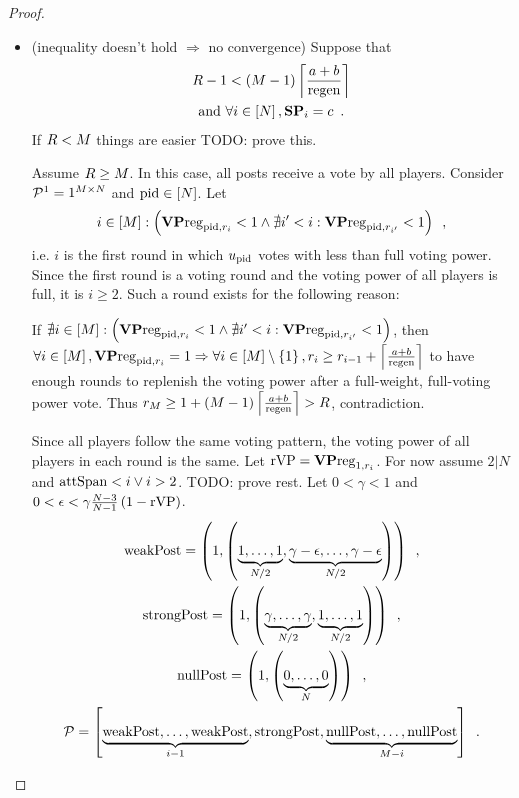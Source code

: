 \begin{proof}
\begin{itemize}
    \item (inequality doesn't hold $\Rightarrow$ no convergence) Suppose that
    \begin{gather}
      \label{conv:proof:fewrounds}
      \rounds - 1 < \left(\postlen - 1\right)\ceil*{\frac{a+b}{\regen}} \\
      \text{and } \forall i \in \left[\playerlen\right], \stpowvec_i = c
      \enspace. \nonumber
    \end{gather}
    If $\rounds < \postlen$ things are easier TODO: prove this.

    Assume $\rounds \geq \postlen$. In this case, all posts receive a vote by
    all players. Consider $\postlist^1 = 1^{\postlen \times \playerlen}$ and
    $\pid \in \left[\playerlen\right]$. Let
    \begin{equation*}
      i \in \left[\postlen\right] :\left(\votpowvecreg_{\pid, \round_i} < 1
      \wedge \nexists i' < i: \votpowvecreg_{\pid, \round_{i'}} < 1\right)
      \enspace,
    \end{equation*}
    i.e. $i$ is the first round in which $u_\pid$ votes with less than full
    voting power. Since the first round is a voting round and the voting power
    of all players is full, it is $i \geq 2$. Such a round exists for the
    following reason:

    If $\nexists i \in \left[\postlen\right] :\left(\votpowvecreg_{\pid,
    \round_i} < 1 \wedge \nexists i' < i: \votpowvecreg_{\pid, \round_{i'}} <
    1\right)$, then $\forall i \in \left[\postlen\right], \votpowvecreg_{\pid,
    \round_i} = 1 \Rightarrow \forall i \in \left[\postlen\right] \setminus
    \left\{1\right\}, \round_i \geq \round_{i - 1} + \ceil*{\frac{a +
    b}{\regen}}$ to have enough rounds to replenish the voting power after a
    full-weight, full-voting power vote. Thus $\round_\postlen \geq 1 +
    \left(\postlen - 1\right)\ceil*{\frac{a + b}{\regen}} > \rounds$,
    contradiction.

    Since all players follow the same voting pattern, the voting power of all
    players in each round is the same. Let $\rvp =
    \votpowvecreg_{1, \round_i}$. For now assume $2 | N$ and $\attspan < i \vee
    i > 2$. TODO: prove rest. Let $0 < \gamma < 1$ and $0 < \epsilon <
    \gamma\frac{\playerlen - 3}{\playerlen - 1}\left(1 -
    \rvp\right)$.
    \begin{gather*}
      \weakpost = \left(1, \left(\underbrace{1, \dots, 1}_{\playerlen/2},
      \underbrace{\gamma - \epsilon, \dots, \gamma -
      \epsilon}_{\playerlen/2}\right)\right) \enspace, \\
      \strongpost = \left(1, \left(\underbrace{\gamma, \dots,
      \gamma}_{\playerlen/2}, \underbrace{1, \dots,
      1}_{\playerlen/2}\right)\right) \enspace, \\
      \nullpost = \left(1, \left(\underbrace{0, \dots,
      0}_{\playerlen}\right)\right) \enspace, \\
      \postlist = \left[\underbrace{\weakpost, \dots, \weakpost}_{i - 1},
      \strongpost, \underbrace{\nullpost, \dots, \nullpost}_{\postlen -
      i}\right] \enspace.
    \end{gather*}


\end{itemize}
\end{proof}
